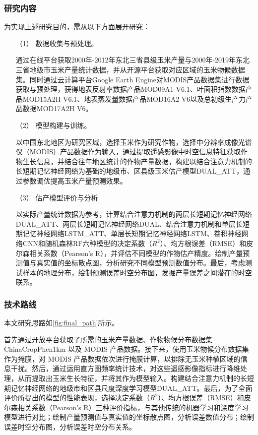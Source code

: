 \subsubsection{研究内容}
\par 为实现上述研究目的，需从以下方面展开研究：
\begin{itemize}
  \item [（1）] 数据收集与预处理。
  \par 通过在线平台获取2000年-2012年东北三省县级玉米产量与2000年-2019年东北三省地级市玉米产量统计数据，并从开源平台获取对应区域的玉米物候数据集。同时通过云计算平台Google Earth Engine对MODIS产品数据集进行数据获取与预处理，获得地表反射率数据产品MOD09A1 V6.1、叶面积指数数据产品MOD15A2H V6.1、地表蒸发量数据产品MOD16A2 V6以及总初级生产力产品数据MOD17A2H V6。
  \item [（2）] 模型构建与训练。
  \par 以中国东北地区为研究区域，选择玉米作为研究作物，选择中分辨率成像光谱仪（MODIS）产品数据作为输入，通过提取遥感影像中时空信息特征获取作物生长信息，并结合往年地区统计的作物产量数据，构建以结合注意力机制的长短期记忆神经网络为基础的地级市、区县级玉米估产模型DUAL\_ATT，通过参数调优提高玉米产量预测效果。
  \item [（3）] 估产模型评价与分析
  \par 以实际产量统计数据为参考，计算结合注意力机制的两层长短期记忆神经网络DUAL\_ATT、两层长短期记忆神经网络DUAL、结合注意力机制和单层长短期记忆神经网络LSTM\_ATT、单层长短期记忆神经网络LSTM、卷积神经网络CNN和随机森林RF六种模型的决定系数（$R^2$）、均方根误差（RMSE）和皮尔森相关系数（Pearson's R），并评估不同模型的作物估产精度。绘制产量预测值与真实值的坐标散点图，分析研究不同模型预测数值分布。最后，考虑测试样本的地理分布，绘制预测误差时空分布图，发掘产量误差之间潜在的时空联系。
\end{itemize}

\subsubsection{技术路线}
\par 本文研究思路如\autoref{fig:final_path}所示。

\par 首先通过开放平台获取了所需的玉米产量数据、作物物候分布数据集 ChinaCropPhen1km 以及 MODIS 产品数据。接下来，使用玉米物候分布数据集作为掩膜，对 MODIS 产品数据依次进行掩膜计算，以排除无玉米种植区域的信息干扰。然后，通过运用直方图频率统计技术，对这些遥感影像指标进行降维处理，从而提取出玉米生长特征，并将其作为模型输入。构建结合注意力机制的长短期记忆神经网络的地级市和区县尺度深度学习模型DUAL\_ATT。最后，为了全面评价所提出的模型的性能表现，选择决定系数（$R^2$）、均方根误差（RMSE）和皮尔森相关系数（Pearson's R）三种评价指标，与其他传统的机器学习和深度学习模型进行对比；绘制产量预测值与真实值的坐标散点图，分析误差数值分布；绘制误差时空分布图，分析误差时空分布关系。

